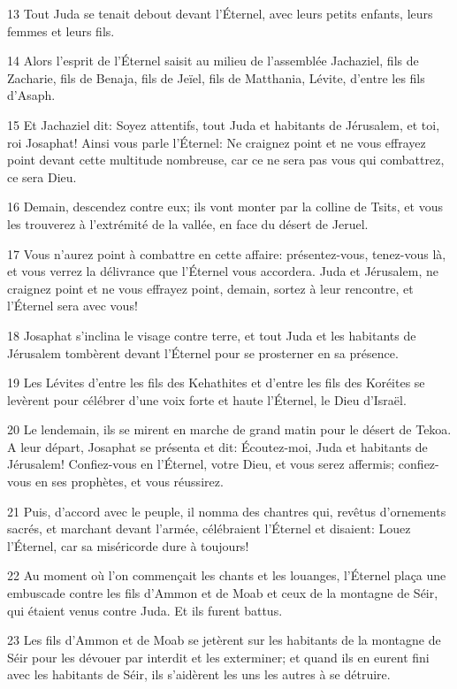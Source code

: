 \par 13 Tout Juda se tenait debout devant l'Éternel, avec leurs petits enfants, leurs femmes et leurs fils.
\par 14 Alors l'esprit de l'Éternel saisit au milieu de l'assemblée Jachaziel, fils de Zacharie, fils de Benaja, fils de Jeïel, fils de Matthania, Lévite, d'entre les fils d'Asaph.
\par 15 Et Jachaziel dit: Soyez attentifs, tout Juda et habitants de Jérusalem, et toi, roi Josaphat! Ainsi vous parle l'Éternel: Ne craignez point et ne vous effrayez point devant cette multitude nombreuse, car ce ne sera pas vous qui combattrez, ce sera Dieu.
\par 16 Demain, descendez contre eux; ils vont monter par la colline de Tsits, et vous les trouverez à l'extrémité de la vallée, en face du désert de Jeruel.
\par 17 Vous n'aurez point à combattre en cette affaire: présentez-vous, tenez-vous là, et vous verrez la délivrance que l'Éternel vous accordera. Juda et Jérusalem, ne craignez point et ne vous effrayez point, demain, sortez à leur rencontre, et l'Éternel sera avec vous!
\par 18 Josaphat s'inclina le visage contre terre, et tout Juda et les habitants de Jérusalem tombèrent devant l'Éternel pour se prosterner en sa présence.
\par 19 Les Lévites d'entre les fils des Kehathites et d'entre les fils des Koréites se levèrent pour célébrer d'une voix forte et haute l'Éternel, le Dieu d'Israël.
\par 20 Le lendemain, ils se mirent en marche de grand matin pour le désert de Tekoa. A leur départ, Josaphat se présenta et dit: Écoutez-moi, Juda et habitants de Jérusalem! Confiez-vous en l'Éternel, votre Dieu, et vous serez affermis; confiez-vous en ses prophètes, et vous réussirez.
\par 21 Puis, d'accord avec le peuple, il nomma des chantres qui, revêtus d'ornements sacrés, et marchant devant l'armée, célébraient l'Éternel et disaient: Louez l'Éternel, car sa miséricorde dure à toujours!
\par 22 Au moment où l'on commençait les chants et les louanges, l'Éternel plaça une embuscade contre les fils d'Ammon et de Moab et ceux de la montagne de Séir, qui étaient venus contre Juda. Et ils furent battus.
\par 23 Les fils d'Ammon et de Moab se jetèrent sur les habitants de la montagne de Séir pour les dévouer par interdit et les exterminer; et quand ils en eurent fini avec les habitants de Séir, ils s'aidèrent les uns les autres à se détruire.
